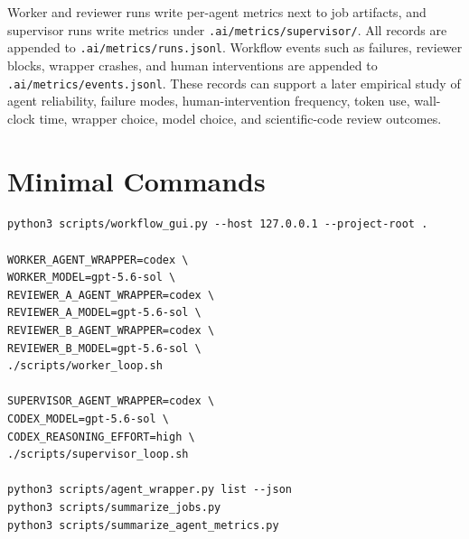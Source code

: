 \documentclass[11pt]{article}
\renewcommand{\path}[1]{\texttt{#1}}
\begin{document}
Worker and reviewer runs write per-agent metrics next to job artifacts, and
supervisor runs write metrics under \path{.ai/metrics/supervisor/}.  All records
are appended to \path{.ai/metrics/runs.jsonl}.  Workflow events such as failures,
reviewer blocks, wrapper crashes, and human interventions are appended to
\path{.ai/metrics/events.jsonl}.  These records can support a later empirical
study of agent reliability, failure modes, human-intervention frequency, token
use, wall-clock time, wrapper choice, model choice, and scientific-code review
outcomes.

\section{Minimal Commands}

\begin{verbatim}
python3 scripts/workflow_gui.py --host 127.0.0.1 --project-root .

WORKER_AGENT_WRAPPER=codex \
WORKER_MODEL=gpt-5.6-sol \
REVIEWER_A_AGENT_WRAPPER=codex \
REVIEWER_A_MODEL=gpt-5.6-sol \
REVIEWER_B_AGENT_WRAPPER=codex \
REVIEWER_B_MODEL=gpt-5.6-sol \
./scripts/worker_loop.sh

SUPERVISOR_AGENT_WRAPPER=codex \
CODEX_MODEL=gpt-5.6-sol \
CODEX_REASONING_EFFORT=high \
./scripts/supervisor_loop.sh

python3 scripts/agent_wrapper.py list --json
python3 scripts/summarize_jobs.py
python3 scripts/summarize_agent_metrics.py
\end{verbatim}
\end{document}

